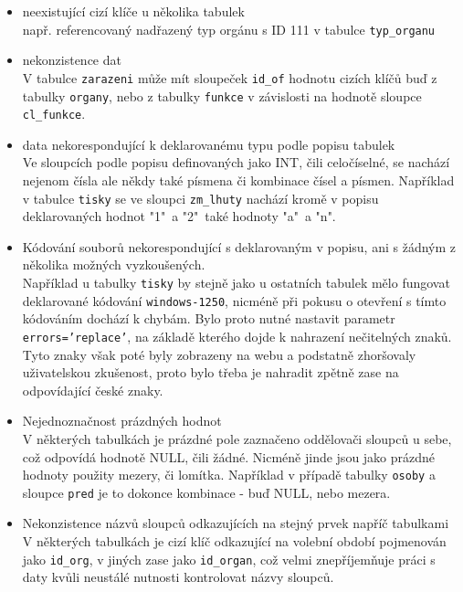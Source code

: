 \begin{itemize}
    \item neexistující cizí klíče u několika tabulek\\
    např. referencovaný nadřazený typ orgánu s ID 111 v tabulce \texttt{typ\_organu}
    \item nekonzistence dat\\
    V tabulce \texttt{zarazeni} může mít sloupeček \texttt{id\_of} hodnotu cizích klíčů buď z tabulky \texttt{organy}, nebo z tabulky \texttt{funkce} v závislosti na hodnotě sloupce \texttt{cl\_funkce}.
    \item data nekorespondující k deklarovanému typu podle popisu tabulek\\
    Ve sloupcích podle popisu definovaných jako INT, čili celočíselné, se nachází nejenom čísla ale někdy také písmena či kombinace čísel a písmen. Například v tabulce \texttt{tisky} se ve sloupci \texttt{zm\_lhuty} nachází kromě v popisu deklarovaných hodnot "1"\ a "2"\ také hodnoty "a"\ a "n".
    \item Kódování souborů nekorespondující s deklarovaným v popisu, ani s žádným z několika možných vyzkoušených.\\
    Například u tabulky \texttt{tisky} by stejně jako u ostatních tabulek mělo fungovat deklarované kódování \texttt{windows-1250}, nicméně při pokusu o otevření s tímto kódováním dochází k chybám. Bylo proto nutné nastavit parametr \texttt{errors='replace'}, na základě kterého dojde k nahrazení nečitelných znaků. Tyto znaky však poté byly zobrazeny na webu a podstatně zhoršovaly uživatelskou zkušenost, proto bylo třeba je nahradit zpětně zase na odpovídající české znaky.
    \item Nejednoznačnost prázdných hodnot\\
    V některých tabulkách je prázdné pole zaznačeno oddělovači sloupců u sebe, což odpovídá hodnotě NULL, čili žádné. Nicméně jinde jsou jako prázdné hodnoty použity mezery, či lomítka. Například v případě tabulky \texttt{osoby} a sloupce \texttt{pred} je to dokonce kombinace - buď NULL, nebo mezera.
    \item Nekonzistence názvů sloupců odkazujících na stejný prvek napříč tabulkami\\
    V některých tabulkách je cizí klíč odkazující na volební období pojmenován jako \texttt{id\_org}, v jiných zase jako \texttt{id\_organ}, což velmi znepříjemňuje práci s daty kvůli neustálé nutnosti kontrolovat názvy sloupců.
    
    
\end{itemize}

